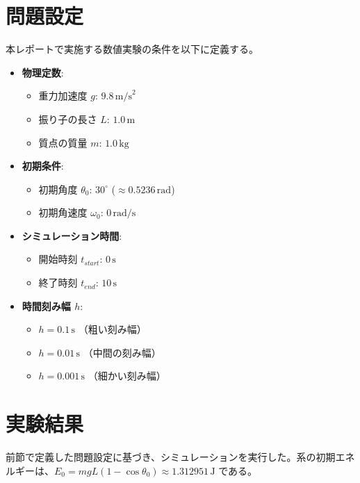 \documentclass{article}
\begin{document}
\section{問題設定}
本レポートで実施する数値実験の条件を以下に定義する。
\begin{itemize}
    \item \textbf{物理定数}:
    \begin{itemize}
        \item 重力加速度 $g$: $9.8 \, \text{m/s}^2$
        \item 振り子の長さ $L$: $1.0 \, \text{m}$
        \item 質点の質量 $m$: $1.0 \, \text{kg}$
    \end{itemize}
    \item \textbf{初期条件}:
    \begin{itemize}
        \item 初期角度 $\theta_0$: $30^\circ$ ($\approx 0.5236 \, \text{rad}$)
        \item 初期角速度 $\omega_0$: $0 \, \text{rad/s}$
    \end{itemize}
    \item \textbf{シミュレーション時間}:
    \begin{itemize}
        \item 開始時刻 $t_{start}$: $0 \, \text{s}$
        \item 終了時刻 $t_{end}$: $10 \, \text{s}$
    \end{itemize}
    \item \textbf{時間刻み幅 $h$}:
    \begin{itemize}
        \item $h = 0.1 \, \text{s}$ （粗い刻み幅）
        \item $h = 0.01 \, \text{s}$ （中間の刻み幅）
        \item $h = 0.001 \, \text{s}$ （細かい刻み幅）
    \end{itemize}
\end{itemize}

\section{実験結果}
前節で定義した問題設定に基づき、シミュレーションを実行した。系の初期エネルギーは、$E_0 = mgL(1-\cos\theta_0) \approx 1.312951 \, \text{J}$ である。
\end{document}
